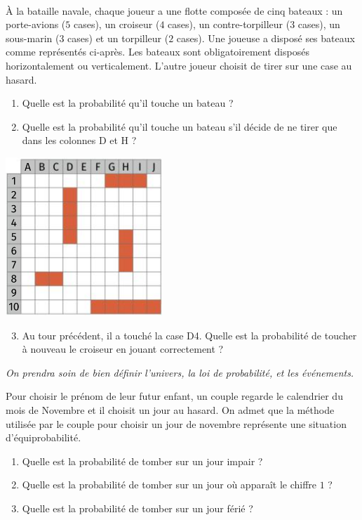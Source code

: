 \documentclass[11pt]{article}
\begin{document}
\begin{exo}~\\
  \begin{minipage}[]{.7\textwidth}
    À la bataille navale, chaque joueur a une flotte composée de cinq bateaux :
    un porte-avions ($5$ cases), un croiseur ($4$ cases), un contre-torpilleur
    ($3$ cases), un sous-marin ($3$ cases) et un torpilleur ($2$ cases). Une
    joueuse a disposé ses bateaux comme représentés ci-après. Les bateaux sont
    obligatoirement disposés horizontalement ou verticalement. L'autre joueur
    choisit de tirer sur une case au hasard.
    \begin{enumerate}
      \item Quelle est la probabilité qu'il touche un bateau ?
      \item Quelle est la probabilité qu'il touche un bateau s'il décide de ne
        tirer que dans les colonnes D et H ?
    \end{enumerate}
  \end{minipage}
  \begin{minipage}[]{.3\textwidth}
    \begin{center}
      \includegraphics[scale=.5]{bataille.png}
    \end{center}
  \end{minipage}
\begin{enumerate}
    \setcounter{enumi}{2}
  \item Au tour précédent, il a touché la case D4. Quelle est la probabilité de
    toucher à nouveau le croiseur en jouant correctement ?
\end{enumerate}
  \emph{On prendra soin de bien définir l'univers, la loi de probabilité, et les
  événements.}
\end{exo}

\begin{exo}
  Pour choisir le prénom de leur futur enfant, un couple regarde le calendrier
  du mois de Novembre et il choisit un jour au hasard. On admet que la méthode
  utilisée par le couple pour choisir un jour de novembre représente une
  situation d'équiprobabilité.
  \begin{enumerate}
    \item Quelle est la probabilité de tomber sur un jour impair ?
    \item Quelle est la probabilité de tomber sur un jour où apparaît le chiffre
      $1$ ?
    \item Quelle est la probabilité de tomber sur un jour férié ?
  \end{enumerate}
\end{exo}
\end{document}
